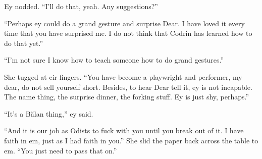 Ey nodded. ``I'll do that, yeah. Any suggestions?''

``Perhaps ey could do a grand gesture and surprise Dear. I have loved it every time that you have surprised me. I do not think that Codrin has learned how to do that yet.''

``I'm not sure I know how to teach someone how to do grand gestures.''

She tugged at eir fingers. ``You have become a playwright and performer, my dear, do not sell yourself short. Besides, to hear Dear tell it, ey is not incapable. The name thing, the surprise dinner, the forking stuff. Ey is just shy, perhaps.''

``It's a Bălan thing,'' ey said.

``And it is our job as Odists to fuck with you until you break out of it. I have faith in em, just as I had faith in you.'' She slid the paper back across the table to em. ``You just need to pass that on.''
